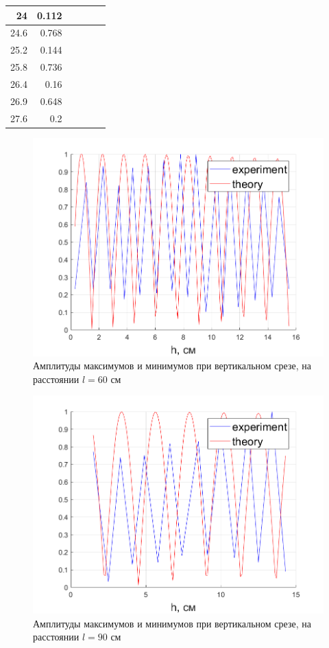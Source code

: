\begin{table}[htbp]
\begin{tabular}{|r|r|r|r|r|r|}
		\midrule
		24    & 0.112 &       &       &       &  \\
		\midrule
		24.6  & 0.768 &       &       &       &  \\
		\midrule
		25.2  & 0.144 &       &       &       &  \\
		\midrule
		25.8  & 0.736 &       &       &       &  \\
		\midrule
		26.4  & 0.16  &       &       &       &  \\
		\midrule
		26.9  & 0.648 &       &       &       &  \\
		\midrule
		27.6  & 0.2   &       &       &       &  \\
		\bottomrule
	\end{tabular}%
\end{table}%


\begin{figure}[H]
	\centering
	\includegraphics[width =0.75\linewidth]{pic/z3_1}
	\caption{Амплитуды максимумов и минимумов при вертикальном срезе, на расстоянии $l=60$ см}
	\label{fig:task31}
\end{figure}

\begin{figure}[H]
	\centering
	\includegraphics[width =0.75\linewidth]{pic/z3_2}
	\caption{Амплитуды максимумов и минимумов при вертикальном срезе, на расстоянии $l=90$ см}
	\label{fig:task32}
\end{figure}

